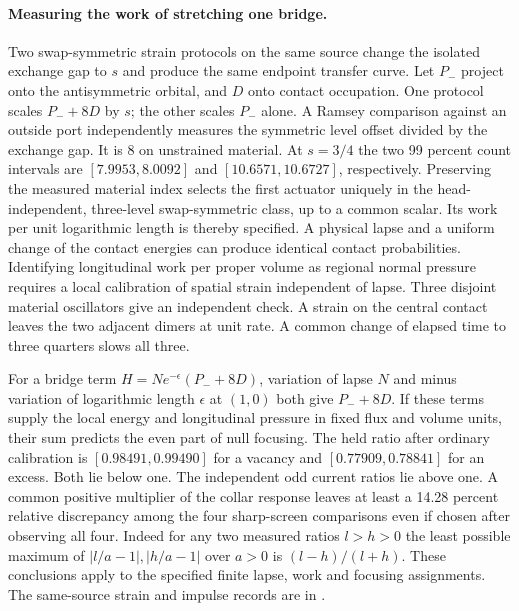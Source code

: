 \documentclass[11pt]{article}
\begin{document}
\paragraph{Measuring the work of stretching one bridge.}
Two swap-symmetric strain protocols on the same source change the
isolated exchange gap to \(s\) and produce the same endpoint transfer
curve. Let \(P_-\) project onto the antisymmetric orbital, and \(D\)
onto contact occupation. One protocol scales
\(P_-+8D\) by \(s\); the other scales \(P_-\) alone.
A Ramsey comparison against an outside port independently measures
the symmetric level offset divided by the exchange gap. It is 8 on
unstrained material. At \(s=3/4\) the two 99 percent count intervals
are \([7.9953,8.0092]\) and \([10.6571,10.6727]\), respectively.
Preserving the measured material index selects the first actuator
uniquely in the head-independent, three-level swap-symmetric class,
up to a common scalar. Its work per unit logarithmic length is thereby
specified. A physical lapse and a uniform change of the contact
energies can produce identical contact probabilities. Identifying
longitudinal work per proper volume as regional normal pressure
requires a local calibration of spatial strain independent of lapse.
Three disjoint material oscillators give an independent check. A strain
on the central contact leaves the two adjacent dimers at unit rate.
A common change of elapsed time to three quarters slows all three.

For a bridge term \(H=N e^{-\epsilon}(P_-+8D)\), variation of
lapse \(N\) and minus variation of logarithmic length \(\epsilon\) at
\((1,0)\) both give \(P_-+8D\). If these terms supply the local
energy and longitudinal pressure in fixed flux and volume units, their
sum predicts the even part of null focusing. The held ratio after
ordinary calibration is \([0.98491,0.99490]\) for a vacancy and
\([0.77909,0.78841]\) for an excess. Both lie below one. The independent
odd current ratios lie above one. A common positive multiplier of the
collar response leaves at least a 14.28 percent relative discrepancy
among the four sharp-screen comparisons even if chosen after observing
all four. Indeed for any two measured ratios \(l>h>0\) the least
possible maximum of \(|l/a-1|,|h/a-1|\) over \(a>0\) is
\((l-h)/(l+h)\). These conclusions apply to the specified finite
lapse, work and focusing assignments. The same-source strain and
impulse records are in .
\end{document}
